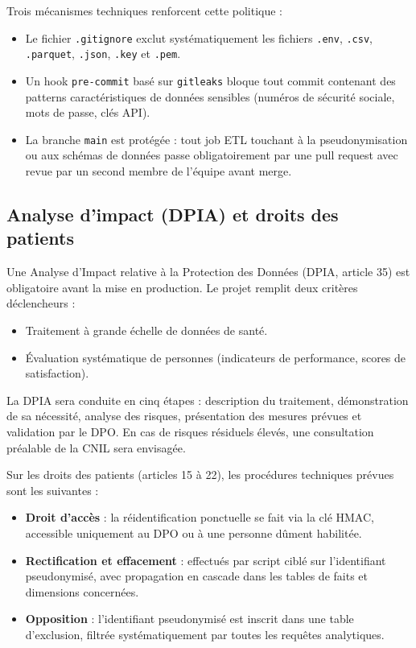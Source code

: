 \documentclass[12pt, a4paper]{report}
\begin{document}
\begin{itemize}[label=\textcolor{chuBlue}{\textbullet}]
Trois mécanismes techniques renforcent cette politique :

\begin{itemize}[label=\textcolor{chuBlue}{\textbullet}]
  \item Le fichier \texttt{.gitignore} exclut systématiquement les fichiers \texttt{.env}, \texttt{.csv}, \texttt{.parquet}, \texttt{.json}, \texttt{.key} et \texttt{.pem}.
  \item Un hook \texttt{pre-commit} basé sur \texttt{gitleaks} bloque tout commit contenant des patterns caractéristiques de données sensibles (numéros de sécurité sociale, mots de passe, clés API).
  \item La branche \texttt{main} est protégée : tout job ETL touchant à la pseudonymisation ou aux schémas de données passe obligatoirement par une pull request avec revue par un second membre de l'équipe avant merge.
\end{itemize}

\subsection{Analyse d'impact (DPIA) et droits des patients}

Une Analyse d'Impact relative à la Protection des Données (DPIA, article 35) est obligatoire avant la mise en production. Le projet remplit deux critères déclencheurs :

\begin{itemize}[label=\textcolor{chuBlue}{\textbullet}]
  \item Traitement à grande échelle de données de santé.
  \item Évaluation systématique de personnes (indicateurs de performance, scores de satisfaction).
\end{itemize}

La DPIA sera conduite en cinq étapes : description du traitement, démonstration de sa nécessité, analyse des risques, présentation des mesures prévues et validation par le DPO. En cas de risques résiduels élevés, une consultation préalable de la CNIL sera envisagée.

Sur les droits des patients (articles 15 à 22), les procédures techniques prévues sont les suivantes :

\begin{itemize}[label=\textcolor{chuBlue}{\textbullet}]
  \item \textbf{Droit d'accès} : la réidentification ponctuelle se fait via la clé HMAC, accessible uniquement au DPO ou à une personne dûment habilitée.
  \item \textbf{Rectification et effacement} : effectués par script ciblé sur l'identifiant pseudonymisé, avec propagation en cascade dans les tables de faits et dimensions concernées.
  \item \textbf{Opposition} : l'identifiant pseudonymisé est inscrit dans une table d'exclusion, filtrée systématiquement par toutes les requêtes analytiques.
\end{itemize}
\clearpage


\end{itemize}
\end{document}

